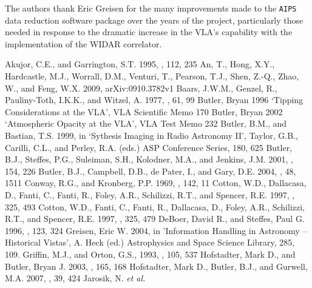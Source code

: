 \documentclass{aastex}
\begin{document}
The authors thank Eric Greisen for the many improvements made to the
\texttt{AIPS} data reduction software package over the years of the
project, particularly those needed in response to the dramatic
increase in the VLA's capability with the implementation of the WIDAR
correlator.  

\begin{thebibliography}{}
 Akujor, C.E., and
  Garrington, S.T. 1995, \aaps, 112, 235
 An, T., Hong, X.Y., Hardcastle,
  M.J., Worrall, D.M., Venturi, T., Pearson, T.J., Shen, Z.-Q., Zhao,
  W., and Feng, W.X. 2009, arXiv:0910.3782v1 
 Baars, J.W.M., Genzel, R.,
  Pauliny-Toth, I.K.K., and Witzel, A. 1977, \aap, 61, 99
 Butler, Bryan 1996 `Tipping
  Considerations at the VLA', VLA Scientific Memo 170
 Butler, Bryan 2002 `Atmospheric Opacity
  at the VLA', VLA Test Memo 232
 Butler, B.M., and Bastian,
  T.S. 1999, in `Sythesis Imaging in Radio Astronomy II', Taylor,
  G.B., Carilli, C.L., and Perley, R.A. (eds.) ASP Conference Series,
  180, 625 
 Butler, B.J., Steffes,
  P.G., Suleiman, S.H., Kolodner, M.A., and Jenkins, J.M. 2001,
  \icarus, 154, 226
 Butler, B.J., Campbell, D.B., de
  Pater, I., and Gary, D.E. 2004, \nar, 48, 1511
 Conway, R.G., and
Kronberg, P.P. 1969, \mnras, 142, 11
 Cotton, W.D., Dallacasa,
  D., Fanti, C., Fanti, R., Foley, A.R., Schilizzi, R.T., and Spencer,
  R.E. 1997, \aap, 325, 493
 Cotton, W.D., Fanti, C.,
  Fanti,  R., Dallacasa, D., Foley, A.R., Schilizzi, R.T., and
  Spencer, R.E. 1997, \aap, 325, 479
 DeBoer, David R., and
  Steffes, Paul G. 1996, \icarus, 123, 324
 Greisen, Eric W. 2004, in 'Information
  Handling in Astronomy -- Historical Vistas', A. Heck (ed.)
  Astrophysics and Space Science Library, 285, 109.
 Griffin, M.J., and Orton,
  G.S., 1993, \icarus, 105, 537
 Hofstadter, Mark D., and
  Butler, Bryan J. 2003, \icarus, 165, 168
 Hofstadter, Mark D.,
  Butler, B.J., and Gurwell, M.A. 2007, \baas, 39, 424
 Jarosik, N. {\sl et al.}

\end{thebibliography}
\end{document}
